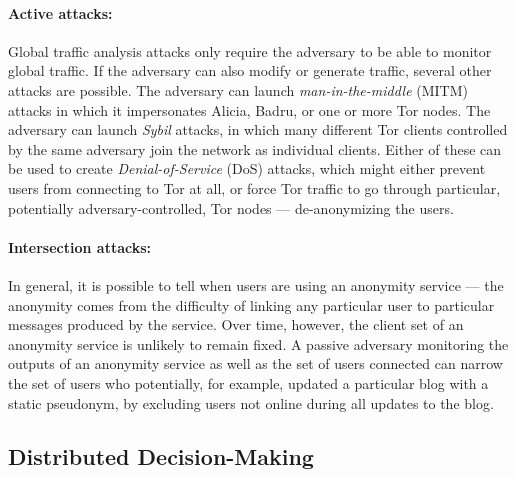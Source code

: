     \paragraph{Active attacks:}
    Global traffic analysis attacks only require the adversary to be able to
    monitor global traffic. If the adversary can also modify or generate
    traffic, several other attacks are possible. The adversary can launch
    \emph{man-in-the-middle} (MITM) attacks in which it impersonates Alicia,
    Badru, or one or more Tor nodes. The adversary can launch \emph{Sybil}
    attacks, in which many different Tor clients controlled by the same
    adversary join the network as individual clients. Either of these can be
    used to create \emph{Denial-of-Service} (DoS) attacks, which might either
    prevent users from connecting to Tor at all, or force Tor traffic to go
    through particular, potentially adversary-controlled, Tor nodes ---
    de-anonymizing the users.
    \paragraph{Intersection attacks:} In general,
    it is possible to tell when users are using an anonymity service --- the
    anonymity comes from the difficulty of linking any particular user to
    particular messages produced by the service. Over time, however, the client
    set of an anonymity service is unlikely to remain fixed. A passive
    adversary monitoring the outputs of an anonymity service as well as
    the set of users connected can narrow the set of users who
    potentially, for example, updated a particular blog with a static
    pseudonym, by excluding users  not online during all updates to the
    blog.

\subsection{Distributed Decision-Making}

